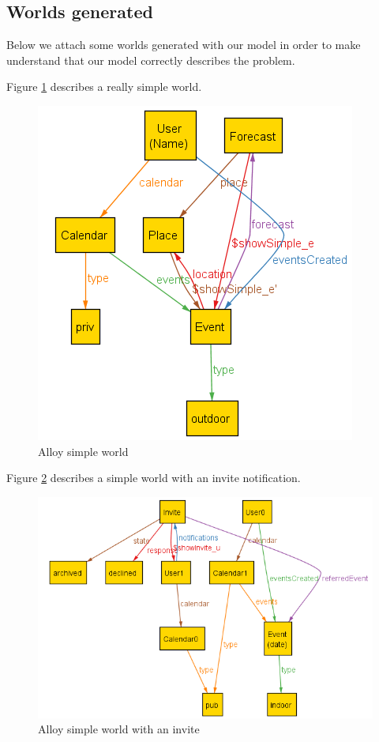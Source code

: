 \documentclass[10pt,a4paper,titlepage]{article}
\begin{document}
\subsection{Worlds generated}
Below we attach some worlds generated with our model in order to make understand that our model correctly describes the problem.

Figure \ref{fig:AlloySimple} describes a really simple world.
\begin{figure}[h!]
\centering
\includegraphics[width=\linewidth]{./Alloy/ShowSimple.png}
\caption[Simple]{Alloy simple world}
\label{fig:AlloySimple}
\end{figure}

Figure \ref{fig:AlloyInvite} describes a simple world with an invite notification.
\begin{figure}[h!]
\centering
\includegraphics[width=\linewidth]{./Alloy/ShowInvite.png}
\caption[Invite]{Alloy simple world with an invite}
\label{fig:AlloyInvite}
\end{figure}
\end{document}
